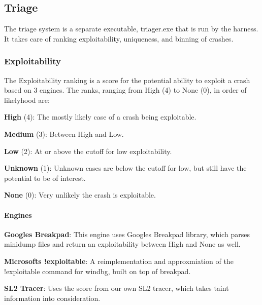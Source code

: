 \subsection*{Triage}

The triage system is a separate executable, {\ttfamily triager.\+exe} that is run by the harness. It takes care of ranking exploitability, uniqueness, and binning of crashes.

\subsubsection*{Exploitability}

The Exploitability ranking is a score for the potential ability to exploit a crash based on 3 engines. The ranks, ranging from High (4) to None (0), in order of likelyhood are\+:


\begin{DoxyItemize}
\item {\bfseries High} (4)\+: The mostly likely case of a crash being exploitable.
\item {\bfseries Medium} (3)\+: Between High and Low.
\item {\bfseries Low} (2)\+: At or above the cutoff for low exploitability.
\item {\bfseries Unknown} (1)\+: Unknown cases are below the cutoff for low, but still have the potential to be of interest.
\item {\bfseries None} (0)\+: Very unlikely the crash is exploitable.
\end{DoxyItemize}

\paragraph*{Engines}


\begin{DoxyItemize}
\item {\bfseries Google\textquotesingle{}s Breakpad}\+: This engine uses Google\textquotesingle{}s Breakpad library, which parses minidump files and return an exploitability between High and None as well.
\item {\bfseries Microsoft\textquotesingle{}s {\ttfamily !exploitable}}\+: A reimplementation and approxmiation of the {\ttfamily !exploitable} command for {\ttfamily windbg}, built on top of breakpad.
\item {\bfseries S\+L2 Tracer}\+: Uses the score from our own S\+L2 tracer, which takes taint information into consideration.
\end{DoxyItemize}

